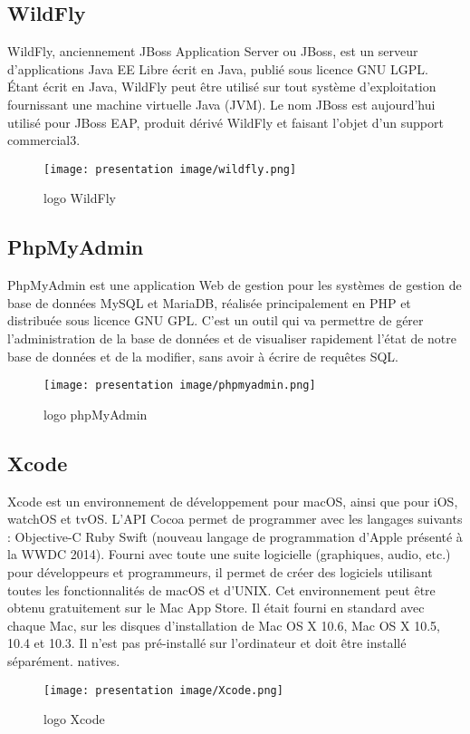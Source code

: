 \subsection{WildFly}
WildFly, anciennement JBoss Application Server ou JBoss, est un serveur d'applications Java EE Libre écrit en Java, publié sous licence GNU LGPL. Étant écrit en Java, WildFly peut être utilisé sur tout système d'exploitation fournissant une machine virtuelle Java (JVM). Le nom JBoss est aujourd'hui utilisé pour JBoss EAP, produit dérivé WildFly et faisant l'objet d'un support commercial3.
\begin{figure}[!h]
\begin{center}
\texttt{[image: presentation image/wildfly.png]}
\end{center}
\caption{logo WildFly}
\end{figure}

\subsection{PhpMyAdmin}
PhpMyAdmin est une application Web de gestion pour les systèmes de gestion de base de données MySQL et MariaDB, réalisée principalement en PHP et distribuée sous licence GNU GPL. C’est un outil qui va permettre de gérer l’administration de la base de données et de visualiser rapidement l'état de notre base de données et de la modifier, sans avoir à écrire de requêtes SQL.
\begin{figure}[!h]
\begin{center}
\texttt{[image: presentation image/phpmyadmin.png]}
\end{center}
\caption{logo phpMyAdmin}
\end{figure}

\subsection{Xcode}
Xcode est un environnement de développement pour macOS, ainsi que pour iOS, watchOS et tvOS. L'API Cocoa permet de programmer avec les langages suivants :  Objective-C  Ruby  Swift (nouveau langage de programmation d'Apple présenté à la WWDC 2014). Fourni avec toute une suite logicielle (graphiques, audio, etc.) pour développeurs et programmeurs, il permet de créer des logiciels utilisant toutes les fonctionnalités de macOS et d'UNIX. Cet environnement peut être obtenu gratuitement sur le Mac App Store. Il était fourni en standard avec chaque Mac, sur les disques d'installation de Mac OS X 10.6, Mac OS X 10.5, 10.4 et 10.3. Il n'est pas pré-installé sur l'ordinateur et doit être installé séparément. natives.
\begin{figure}[!h]
\begin{center}
\texttt{[image: presentation image/Xcode.png]}
\end{center}
\caption{logo Xcode}
\end{figure}

